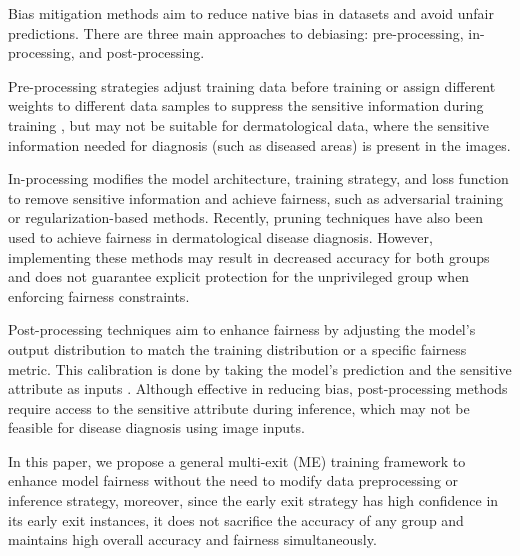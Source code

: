 Bias mitigation methods aim to reduce native bias in datasets and avoid unfair predictions. There are three main approaches to debiasing: pre-processing, in-processing, and post-processing.

Pre-processing strategies adjust training data before training \cite{ngxande2020bias,lu2020gender} or assign different weights to different data samples to suppress the sensitive information during training \cite{kamiran2012data}, but may not be suitable for dermatological data, where the sensitive information needed for diagnosis (such as diseased areas) is present in the images.

In-processing modifies the model architecture, training strategy, and loss function to remove sensitive information\cite{wang2020towards} and achieve fairness, such as adversarial training \cite{alvi2018turning,zhang2018mitigating} or regularization-based \cite{quadrianto2019discovering,jung2021fair} methods. Recently, pruning \cite{wu2022fairprune} techniques have also been used to achieve fairness in dermatological disease diagnosis. However, implementing these methods may result in decreased accuracy for both groups and does not guarantee explicit protection for the unprivileged group when enforcing fairness constraints.

Post-processing techniques aim to enhance fairness by adjusting the model's output distribution to match the training distribution or a specific fairness metric. This calibration is done by taking the model's prediction and the sensitive attribute as inputs \cite{hardt2016equality,zhao2017men,du2020fairness}. Although effective in reducing bias, post-processing methods require access to the sensitive attribute during inference, which may not be feasible for disease diagnosis using image inputs.

In this paper, we propose a general multi-exit (ME) training framework to enhance model fairness without the need to modify data preprocessing or inference strategy, moreover, since the early exit strategy has high confidence in its early exit instances, it does not sacrifice the accuracy of any group and maintains high overall accuracy and fairness simultaneously.


